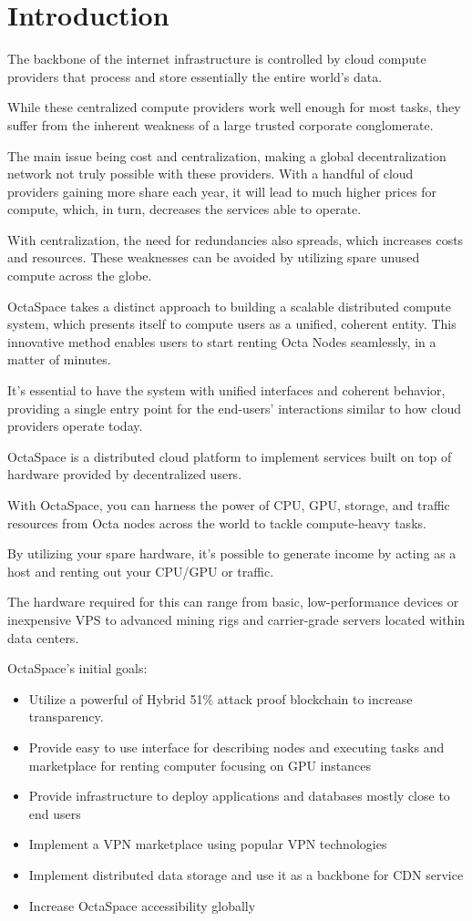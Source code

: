 \section{Introduction}
The backbone of the internet infrastructure is controlled by cloud compute providers that process and store essentially the entire world's data.

While these centralized compute providers work well enough for most tasks, they suffer from the inherent weakness of a large trusted corporate conglomerate.

The main issue being cost and centralization, making a global decentralization network not truly possible with these providers. With a handful of cloud providers gaining more share each year, it will lead to much higher prices for compute, which, in turn, decreases the services able to operate.

With centralization, the need for redundancies also spreads, which increases costs and resources.
These weaknesses can be avoided by utilizing spare unused compute across the globe.

OctaSpace takes a distinct approach to building a scalable distributed compute system, which presents itself to compute users as a unified, coherent entity. This innovative method enables users to start renting Octa Nodes seamlessly, in a matter of minutes.

It's essential to have the system with unified interfaces and coherent behavior, providing a single entry point for the end-users' interactions similar to how cloud providers operate today.

OctaSpace is a distributed cloud platform to implement services built on top of hardware provided by decentralized users.

With OctaSpace, you can harness the power of CPU, GPU, storage, and traffic resources from Octa nodes across the world to tackle compute-heavy tasks.

By utilizing your spare hardware, it's possible to generate income by acting as a host and renting out your CPU/GPU or traffic.

The hardware required for this can range from basic, low-performance devices or inexpensive VPS to advanced mining rigs and carrier-grade servers located within data centers.

OctaSpace's initial goals:

\begin{itemize}
    \item Utilize a powerful of Hybrid 51\% attack proof blockchain to increase transparency.
    \item Provide easy to use interface for describing nodes and executing tasks and marketplace for renting computer focusing on GPU instances
    \item Provide infrastructure to deploy applications and databases mostly close to end users
    \item Implement a VPN marketplace using popular VPN technologies
    \item Implement distributed data storage and use it as a backbone for CDN service
    \item Increase OctaSpace accessibility globally
\end{itemize}

